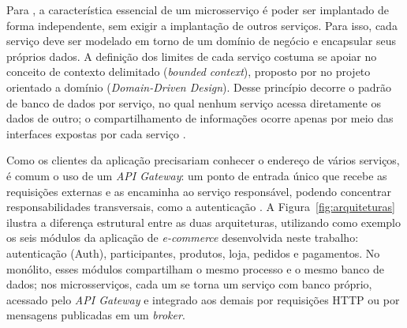 Para , a característica essencial de um microsserviço é poder ser
implantado de forma independente, sem exigir a implantação de outros serviços. Para isso, cada
serviço deve ser modelado em torno de um domínio de negócio e encapsular seus próprios dados.
A definição dos limites de cada serviço costuma se apoiar no conceito de contexto delimitado
(\textit{bounded context}), proposto por  no projeto orientado a domínio
(\textit{Domain-Driven Design}). Desse princípio decorre o padrão de banco de dados por
serviço, no qual nenhum serviço acessa diretamente os dados de outro; o compartilhamento de
informações ocorre apenas por meio das interfaces expostas por cada serviço
\cite{richardson2018}.

Como os clientes da aplicação precisariam conhecer o endereço de vários serviços, é comum o
uso de um \textit{API Gateway}: um ponto de entrada único que recebe as requisições externas e
as encaminha ao serviço responsável, podendo concentrar responsabilidades transversais, como a
autenticação \cite{richardson2018}. A Figura~\ref{fig:arquiteturas} ilustra a diferença
estrutural entre as duas arquiteturas, utilizando como exemplo os seis módulos da aplicação de
\textit{e-commerce} desenvolvida neste trabalho: autenticação (Auth), participantes, produtos,
loja, pedidos e pagamentos. No monólito, esses módulos compartilham o mesmo processo e o mesmo
banco de dados; nos microsserviços, cada um se torna um serviço com banco próprio, acessado
pelo \textit{API Gateway} e integrado aos demais por requisições HTTP ou por mensagens
publicadas em um \textit{broker}.

